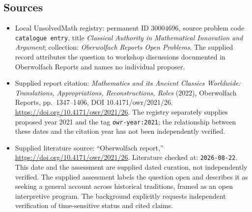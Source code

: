 \documentclass[11pt]{article}
\begin{document}
\subsection{Sources}
\begin{itemize}
\item Local UnsolvedMath registry: permanent ID \(30004696\), source problem code \texttt{catalogue entry}, title \emph{Classical Authority in Mathematical Innovation and Argument}; collection: \emph{Oberwolfach Reports Open Problems}. The supplied record attributes the question to workshop discussions documented in Oberwolfach Reports and names no individual proposer.
\item Supplied report citation: \emph{Mathematics and its Ancient Classics Worldwide: Translations, Appropriations, Reconstructions, Roles} (2022), Oberwolfach Reports, pp.\ 1347--1406, DOI 10.4171/owr/2021/26. \url{https://doi.org/10.4171/owr/2021/26}. The registry separately supplies proposed year 2021 and the tag \texttt{owr-year:2021}; the relationship between these dates and the citation year has not been independently verified.
\item Supplied literature source: ``Oberwolfach report,'' \url{https://doi.org/10.4171/owr/2021/26}. Literature checked at: \texttt{2026-08-22}. This date and the assessment are supplied dated curation, not independently verified. The supplied assessment labels the question open and describes it as seeking a general account across historical traditions, framed as an open interpretive program. The background explicitly requests independent verification of time-sensitive status and cited claims.
\end{itemize}
\end{document}
